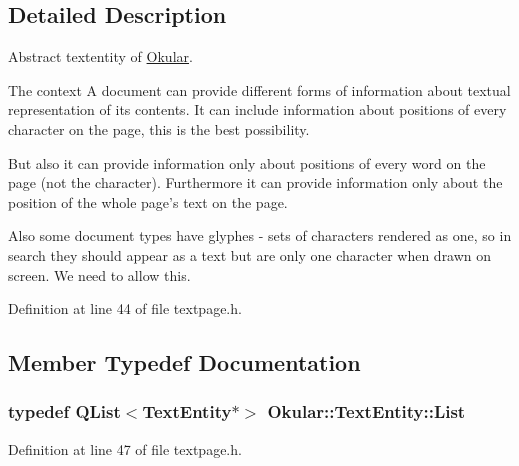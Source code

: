 \subsection{Detailed Description}
Abstract textentity of \hyperlink{namespaceOkular}{Okular}. 

\begin{DoxyParagraph}{The context}
A document can provide different forms of information about textual representation of its contents. It can include information about positions of every character on the page, this is the best possibility.
\end{DoxyParagraph}
But also it can provide information only about positions of every word on the page (not the character). Furthermore it can provide information only about the position of the whole page's text on the page.

Also some document types have glyphes -\/ sets of characters rendered as one, so in search they should appear as a text but are only one character when drawn on screen. We need to allow this. 

Definition at line 44 of file textpage.\+h.



\subsection{Member Typedef Documentation}
\hypertarget{classOkular_1_1TextEntity_a9deacb4422ede69001915b33ca21c023}{
\subsubsection[{List}]{\setlength{\rightskip}{0pt plus 5cm}typedef {\bf Q\+List}$<${\bf Text\+Entity}$\ast$$>$ {\bf Okular\+::\+Text\+Entity\+::\+List}}}\label{classOkular_1_1TextEntity_a9deacb4422ede69001915b33ca21c023}


Definition at line 47 of file textpage.\+h.



